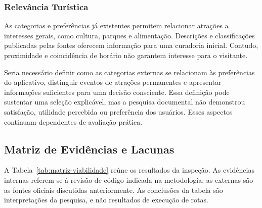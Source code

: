 \subsubsection{Relevância Turística}

As categorias e preferências já existentes permitem relacionar atrações a interesses gerais, como cultura, parques e alimentação. Descrições e classificações publicadas pelas fontes oferecem informação para uma curadoria inicial. Contudo, proximidade e coincidência de horário não garantem interesse para o visitante.

Seria necessário definir como as categorias externas se relacionam às preferências do aplicativo, distinguir eventos de atrações permanentes e apresentar informações suficientes para uma decisão consciente. Essa definição pode sustentar uma seleção explicável, mas a pesquisa documental não demonstrou satisfação, utilidade percebida ou preferência dos usuários. Esses aspectos continuam dependentes de avaliação prática.

\clearpage
\subsection{Matriz de Evidências e Lacunas}

A Tabela~\ref{tab:matriz-viabilidade} reúne os resultados da inspeção. As evidências internas referem-se à revisão de código indicada na metodologia; as externas são as fontes oficiais discutidas anteriormente. As conclusões da tabela são interpretações da pesquisa, e não resultados de execução de rotas.

